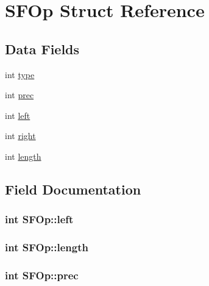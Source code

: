 \hypertarget{structSFOp}{}\section{S\+F\+Op Struct Reference}
\label{structSFOp}
\subsection*{Data Fields}
\begin{DoxyCompactItemize}
\item 
int \hyperlink{structSFOp_a2edfc96ff91474523b5bda2185158ffa}{type}
\item 
int \hyperlink{structSFOp_ae4c13ff3ed16b56c55f822e84b9db21a}{prec}
\item 
int \hyperlink{structSFOp_adc97e181b0efdcff6b921b82979ab80f}{left}
\item 
int \hyperlink{structSFOp_a53d1624dfd48f82123f055f8578646e7}{right}
\item 
int \hyperlink{structSFOp_a3b91d02ed1a1a1c664a3cfb062e60ed1}{length}
\end{DoxyCompactItemize}


\subsection{Field Documentation}
\subsubsection[{\texorpdfstring{left}{left}}]{\setlength{\rightskip}{0pt plus 5cm}int S\+F\+Op\+::left}\hypertarget{structSFOp_adc97e181b0efdcff6b921b82979ab80f}{}\label{structSFOp_adc97e181b0efdcff6b921b82979ab80f}
\subsubsection[{\texorpdfstring{length}{length}}]{\setlength{\rightskip}{0pt plus 5cm}int S\+F\+Op\+::length}\hypertarget{structSFOp_a3b91d02ed1a1a1c664a3cfb062e60ed1}{}\label{structSFOp_a3b91d02ed1a1a1c664a3cfb062e60ed1}
\subsubsection[{\texorpdfstring{prec}{prec}}]{\setlength{\rightskip}{0pt plus 5cm}int S\+F\+Op\+::prec}\hypertarget{structSFOp_ae4c13ff3ed16b56c55f822e84b9db21a}{}\label{structSFOp_ae4c13ff3ed16b56c55f822e84b9db21a}
